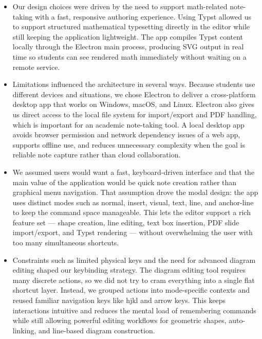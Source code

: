 \documentclass{article}
\begin{document}
\begin{itemize}
  \item Our design choices were driven by the need to support math-related note-taking
    with a fast, responsive authoring experience. Using Typst allowed us to support
    structured mathematical typesetting directly in the editor while still keeping the
    application lightweight. The app compiles Typst content locally through the Electron
    main process, producing SVG output in real time so students can see rendered math
    immediately without waiting on a remote service.

  \item Limitations influenced the architecture in several ways. Because students use
    different devices and situations, we chose Electron to deliver a cross-platform
    desktop app that works on Windows, macOS, and Linux. Electron also gives us direct
    access to the local file system for import/export and PDF handling, which is important
    for an academic note-taking tool. A local desktop app avoids browser permission and
    network dependency issues of a web app, supports offline use, and reduces unnecessary
    complexity when the goal is reliable note capture rather than cloud collaboration.

  \item We assumed users would want a fast, keyboard-driven interface and that the main
    value of the application would be quick note creation rather than graphical menu
    navigation. That assumption drove the modal design: the app uses distinct modes such as
    normal, insert, visual, text, line, and anchor-line to keep the command space manageable.
    This lets the editor support a rich feature set — shape creation, line editing, text box
    insertion, PDF slide import/export, and Typst rendering — without overwhelming the user
    with too many simultaneous shortcuts.

  \item Constraints such as limited physical keys and the need for advanced diagram editing
    shaped our keybinding strategy. The diagram editing tool requires many discrete actions,
    so we did not try to cram everything into a single flat shortcut layer. Instead, we
    grouped actions into mode-specific contexts and reused familiar navigation keys like hjkl
    and arrow keys. This keeps interactions intuitive and reduces the mental load of
    remembering commands while still allowing powerful editing workflows for geometric shapes,
    auto-linking, and line-based diagram construction.
\end{itemize}
\end{document}
